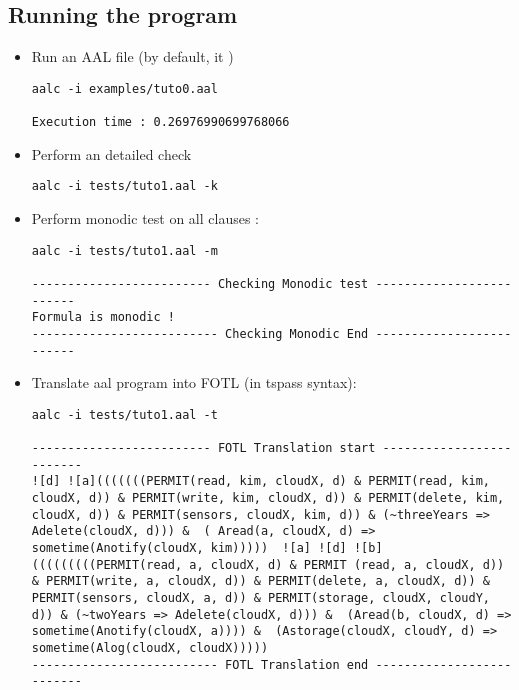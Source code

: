 \subsection{Running the program}
{
\begin{itemize}
	\item Run an AAL file (by default, it )
\begin{lstlisting}
aalc -i examples/tuto0.aal

Execution time : 0.26976990699768066
\end{lstlisting}

	\item Perform an detailed check
\begin{lstlisting}
aalc -i tests/tuto1.aal -k

\end{lstlisting}


	\item Perform monodic test on all clauses :
\begin{lstlisting}
aalc -i tests/tuto1.aal -m

------------------------- Checking Monodic test -------------------------
Formula is monodic !
-------------------------- Checking Monodic End -------------------------
\end{lstlisting}


	\item Translate aal program into FOTL (in tspass syntax):
\begin{lstlisting}
aalc -i tests/tuto1.aal -t

------------------------- FOTL Translation start -------------------------
![d] ![a](((((((PERMIT(read, kim, cloudX, d) & PERMIT(read, kim, cloudX, d)) & PERMIT(write, kim, cloudX, d)) & PERMIT(delete, kim, cloudX, d)) & PERMIT(sensors, cloudX, kim, d)) & (~threeYears => Adelete(cloudX, d))) &  ( Aread(a, cloudX, d) => sometime(Anotify(cloudX, kim)))))  ![a] ![d] ![b](((((((((PERMIT(read, a, cloudX, d) & PERMIT (read, a, cloudX, d)) & PERMIT(write, a, cloudX, d)) & PERMIT(delete, a, cloudX, d)) & PERMIT(sensors, cloudX, a, d)) & PERMIT(storage, cloudX, cloudY, d)) & (~twoYears => Adelete(cloudX, d))) &  (Aread(b, cloudX, d) => sometime(Anotify(cloudX, a)))) &  (Astorage(cloudX, cloudY, d) => sometime(Alog(cloudX, cloudX))))) 
-------------------------- FOTL Translation end --------------------------
\end{lstlisting}

\end{itemize}
}




